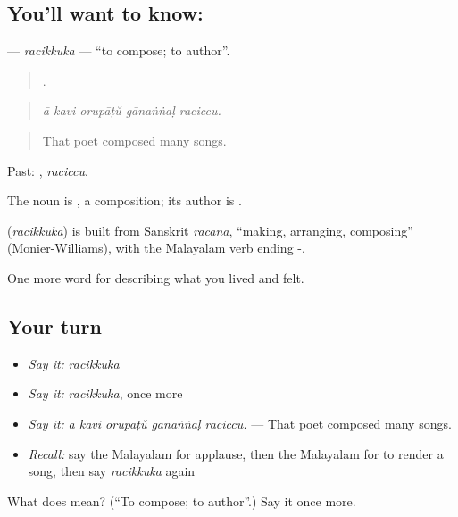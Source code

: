 \subsection*{You'll want to know: }
\textbf{} — \emph{racikkuka} — \textquotedblleft{}to compose; to author\textquotedblright{}.

\begin{quote}
    .
\end{quote}

\begin{quote}
\emph{ā kavi orupāṭŭ gānaṅṅaḷ raciccu.}
\end{quote}

\begin{quote}
That poet composed many songs.
\end{quote}

Past: , \emph{raciccu}.

The noun is , a composition; its author is .

\begin{cousinweb}
\textbf{} (\emph{racikkuka}) is built from Sanskrit \emph{racana}, \textquotedblleft{}making, arranging, composing\textquotedblright{} (Monier-Williams), with the Malayalam verb ending -.
\end{cousinweb}

\begin{grammarlens}[title={What you've built}]
One more word for describing what you lived and felt.
\end{grammarlens}

\subsection*{Your turn}
\begin{itemize}
\raggedright
  \item \emph{Say it:} \emph{racikkuka}
  \item \emph{Say it:} \emph{racikkuka}, once more
  \item \emph{Say it:} \emph{ā kavi orupāṭŭ gānaṅṅaḷ raciccu.} — That poet composed many songs.
  \item \emph{Recall:} say the Malayalam for applause, then the Malayalam for to render a song, then say \emph{racikkuka} again
\end{itemize}

\begin{tcolorbox}[breakable,colback=teal!4,colframe=teal!35!black,title={Before you move on}]
What does  mean? (\textquotedblleft{}To compose; to author\textquotedblright{}.) Say it once more.
\end{tcolorbox}
